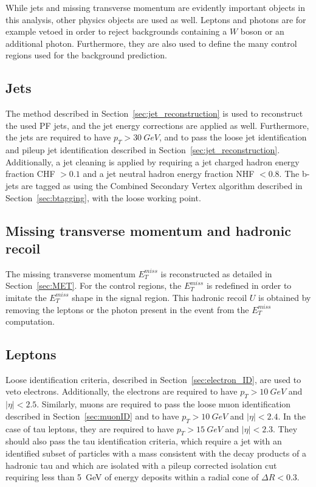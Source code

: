 While jets and missing transverse momentum are evidently important objects in this analysis, other physics objects are used as well. Leptons and photons are for example vetoed in order to reject backgrounds containing a $W$ boson or an additional photon. Furthermore, they are also used to define the many control regions used for the background prediction. 

\subsection{Jets}

The method described in Section~\ref{sec:jet_reconstruction} is used to reconstruct the used \ac{PF} jets, and the jet energy corrections are applied as well. Furthermore, the jets are required to have $p_T > \SI{30}{GeV}$, and to pass the loose jet identification and pileup jet identification described in Section~\ref{sec:jet_reconstruction}. Additionally, a jet cleaning is applied by requiring a jet charged hadron energy fraction CHF $> 0.1$ and a jet neutral hadron energy fraction NHF $< 0.8$. The b- jets are tagged as using the Combined Secondary Vertex algorithm described in Section~\ref{sec:btagging}, with the loose working point.

\subsection{Missing transverse momentum and hadronic recoil}

The missing transverse momentum $E_T^{miss}$ is reconstructed as detailed in Section~\ref{sec:MET}. For the control regions, the $E_T^{miss}$ is redefined in order to imitate the $E_T^{miss}$ shape in the signal region. This hadronic recoil $U$ is obtained by removing the leptons or the photon present in the event from the $E_T^{miss}$ computation.

\subsection{Leptons}

Loose identification criteria, described in Section~\ref{sec:electron_ID}, are used to veto electrons. Additionally, the electrons are required to have $p_T > \SI{10}{GeV}$ and $|\eta| < 2.5$. Similarly, muons are required to pass the loose muon identification described in Section~\ref{sec:muonID} and to have $p_T > \SI{10}{GeV}$ and $|\eta| < 2.4$. In the case of tau leptons, they are required to have $p_T > \SI{15}{GeV}$ and $|\eta| < 2.3$. They should also pass the tau identification criteria, which require a jet with an identified subset of particles with a mass consistent with the decay products of a hadronic tau and which are isolated with a pileup corrected isolation cut requiring less than \SI{5}{GeV} of energy deposits within a radial cone of $\Delta R < 0.3$. 

